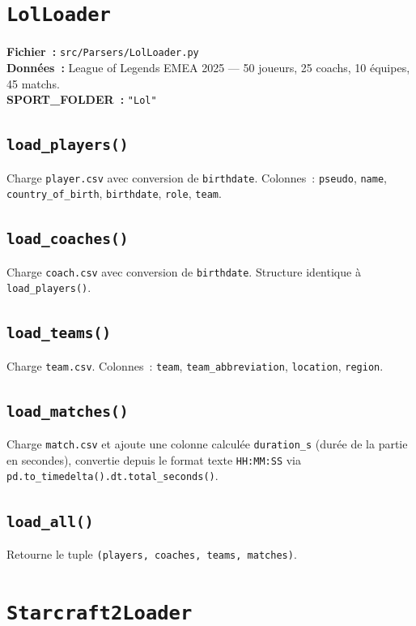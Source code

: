 \documentclass[12pt,a4paper]{article}
\begin{document}
\section{\texttt{LolLoader}}

\textbf{Fichier~:} \texttt{src/Parsers/LolLoader.py}\\
\textbf{Données~:} League of Legends EMEA 2025 — 50 joueurs, 25 coachs,
10 équipes, 45 matchs.\\
\textbf{SPORT\_FOLDER~:} \texttt{"Lol"}

\subsection{\texttt{load\_players()}}
Charge \texttt{player.csv} avec conversion de \texttt{birthdate}. Colonnes~:
\texttt{pseudo}, \texttt{name}, \texttt{country\_of\_birth}, \texttt{birthdate},
\texttt{role}, \texttt{team}.

\subsection{\texttt{load\_coaches()}}
Charge \texttt{coach.csv} avec conversion de \texttt{birthdate}.
Structure identique à \texttt{load\_players()}.

\subsection{\texttt{load\_teams()}}
Charge \texttt{team.csv}. Colonnes~: \texttt{team}, \texttt{team\_abbreviation},
\texttt{location}, \texttt{region}.

\subsection{\texttt{load\_matches()}}
Charge \texttt{match.csv} et ajoute une colonne calculée \texttt{duration\_s}
(durée de la partie en secondes), convertie depuis le format texte
\texttt{HH:MM:SS} via \texttt{pd.to\_timedelta().dt.total\_seconds()}.

\subsection{\texttt{load\_all()}}
Retourne le tuple \texttt{(players, coaches, teams, matches)}.

\section{\texttt{Starcraft2Loader}}
\end{document}
